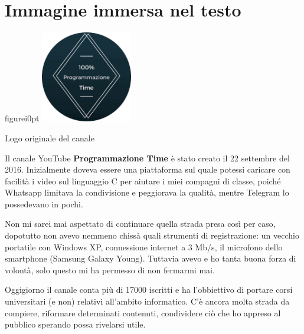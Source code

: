 \documentclass[a4paper,12pt,oneside]{book}
\theoremstyle{plain}
\begin{document}
	\section{Immagine immersa nel testo}
	\begin{wrapfloat}{figure}{i}{0pt}
		\includegraphics[width=0.3\textwidth]{vecchio}
		\caption{Logo originale del canale}
	\end{wrapfloat}
	Il canale YouTube \textbf{Programmazione Time} è stato creato il 22 settembre del 2016. Inizialmente doveva essere una piattaforma sul quale potessi caricare con facilità i video sul linguaggio C per aiutare i miei compagni di classe, poiché Whatsapp limitava la condivisione e peggiorava la qualità, mentre Telegram lo possedevano in pochi.
	
	Non mi sarei mai aspettato di continuare quella strada presa così per caso, dopotutto non avevo nemmeno chissà quali strumenti di registrazione: un vecchio portatile con Windows XP, connessione internet a 3 Mb/s, il microfono dello smartphone (Samsung Galaxy Young). Tuttavia avevo e ho tanta buona forza di volontà, solo questo mi ha permesso di non fermarmi mai.
	
	Oggigiorno il canale conta più di 17000 iscritti e ha l'obbiettivo di portare corsi universitari (e non) relativi all'ambito informatico. C'è ancora molta strada da compiere, riformare determinati contenuti, condividere ciò che ho appreso al pubblico sperando possa rivelarsi utile.
	
	
	
\end{document}
